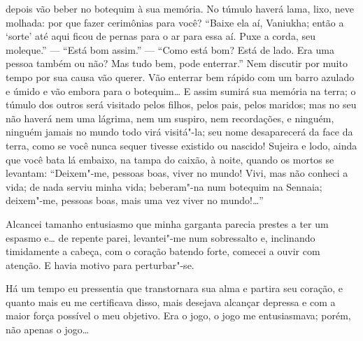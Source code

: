 depois vão beber no botequim à sua memória. No túmulo haverá lama,
lixo, neve molhada: por que fazer cerimônias para você? “Baixe ela aí,
Vaniukha; então a ‘sorte’ até aqui ficou de pernas para o ar para essa
aí. Puxe a corda, seu moleque.” --- “Está bom assim.” --- “Como está bom?
Está de lado. Era uma pessoa também ou não? Mas tudo bem, pode
enterrar.” Nem discutir por muito tempo por sua causa vão querer. Vão
enterrar bem rápido com um barro azulado e úmido e vão embora para o
botequim\ldots{} E assim sumirá sua memória na terra; o túmulo dos outros
será visitado pelos filhos, pelos pais, pelos maridos; mas no seu não
haverá nem uma lágrima, nem um suspiro, nem recordações, e ninguém,
ninguém jamais no mundo todo virá visitá"-la; seu nome desaparecerá da
face da terra, como se você nunca sequer tivesse existido ou nascido!
Sujeira e lodo, ainda que você bata lá embaixo, na tampa do caixão, à
noite, quando os mortos se levantam: “Deixem"-me, pessoas boas, viver no
mundo! Vivi, mas não conheci a vida; de nada serviu minha vida;
beberam"-na num botequim na Sennaia; deixem"-me, pessoas boas, mais uma
vez viver no mundo!\ldots{}”

Alcancei tamanho entusiasmo que minha garganta parecia prestes a ter um
espasmo e\ldots{} de repente parei, levantei"-me num sobressalto e,
inclinando timidamente a cabeça, com o coração batendo forte, comecei a
ouvir com atenção. E havia motivo para perturbar"-se.

Há um tempo eu pressentia que transtornara sua alma e partira seu
coração, e quanto mais eu me certificava disso, mais desejava alcançar
depressa e com a maior força possível o meu objetivo. Era o jogo, o
jogo me entusiasmava; porém, não apenas o jogo\ldots{}

